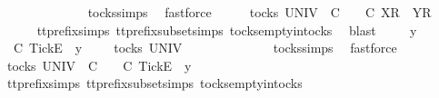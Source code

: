 \begin{isabellebody}
\ \ \isamarkupfalse%
\ \isamarkupfalse%
\ {\isachardoublequoteopen}{\isasymrho}\ {\isacharequal}\ {\isacharbrackleft}{\isacharbrackright}{\isachardoublequoteclose}\isanewline
\ \ \ \ \isamarkupfalse%
\ tocks{\isachardot}simps\ \isamarkupfalse%
\ fastforce\isanewline
\ \ \isamarkupfalse%
\ \isamarkupfalse%
\ {\isachardoublequoteopen}{\isasymexists}{\isasymrho}{\isacharprime}{\isasymin}tocks\ UNIV{\isachardot}\ {\isasymrho}\ {\isasymlesssim}\isactrlsub C\ {\isasymrho}{\isacharprime}\ {\isasymand}\ {\isasymrho}{\isacharprime}\ {\isasymle}\isactrlsub C\ {\isacharbrackleft}X{\isacharbrackright}\isactrlsub R\ {\isacharhash}\ {\isacharbrackleft}Y{\isacharbrackright}\isactrlsub R\ {\isacharhash}\ {\isasymsigma}{\isachardoublequoteclose}\isanewline
\ \ \ \ \isamarkupfalse%
\ tt{\isacharunderscore}prefix{\isachardot}simps{\isacharparenleft}{}{\isacharparenright}\ tt{\isacharunderscore}prefix{\isacharunderscore}subset{\isachardot}simps{\isacharparenleft}{}{\isacharparenright}\ tocks{\isachardot}empty{\isacharunderscore}in{\isacharunderscore}tocks\ \isamarkupfalse%
\ blast\isanewline
{}\isamarkupfalse%
\isanewline
\ \ \isamarkupfalse%
\ {\isasymrho}\ y\ {\isasymsigma}\isanewline
\ \ \isamarkupfalse%
\ {\isachardoublequoteopen}{\isasymrho}\ {\isasymlesssim}\isactrlsub C\ {\isacharbrackleft}Tick{\isacharbrackright}\isactrlsub E\ {\isacharhash}\ y\ {\isacharhash}\ {\isasymsigma}{\isachardoublequoteclose}\ {\isachardoublequoteopen}{\isasymrho}\ {\isasymin}\ tocks\ UNIV{\isachardoublequoteclose}\isanewline
\ \ \isamarkupfalse%
\ \isamarkupfalse%
\ {\isachardoublequoteopen}{\isasymrho}\ {\isacharequal}\ {\isacharbrackleft}{\isacharbrackright}{\isachardoublequoteclose}\isanewline
\ \ \ \ \isamarkupfalse%
\ tocks{\isachardot}simps\ \isamarkupfalse%
\ fastforce\isanewline
\ \ \isamarkupfalse%
\ \isamarkupfalse%
\ {\isachardoublequoteopen}{\isasymexists}{\isasymrho}{\isacharprime}{\isasymin}tocks\ UNIV{\isachardot}\ {\isasymrho}\ {\isasymlesssim}\isactrlsub C\ {\isasymrho}{\isacharprime}\ {\isasymand}\ {\isasymrho}{\isacharprime}\ {\isasymle}\isactrlsub C\ {\isacharbrackleft}Tick{\isacharbrackright}\isactrlsub E\ {\isacharhash}\ y\ {\isacharhash}\ {\isasymsigma}{\isachardoublequoteclose}\isanewline
\ \ \ \ \isamarkupfalse%
\ tt{\isacharunderscore}prefix{\isachardot}simps{\isacharparenleft}{}{\isacharparenright}\ tt{\isacharunderscore}prefix{\isacharunderscore}subset{\isachardot}simps{\isacharparenleft}{}{\isacharparenright}\ tocks{\isachardot}empty{\isacharunderscore}in{\isacharunderscore}tocks\ \isamarkupfalse%

\end{isabellebody}
